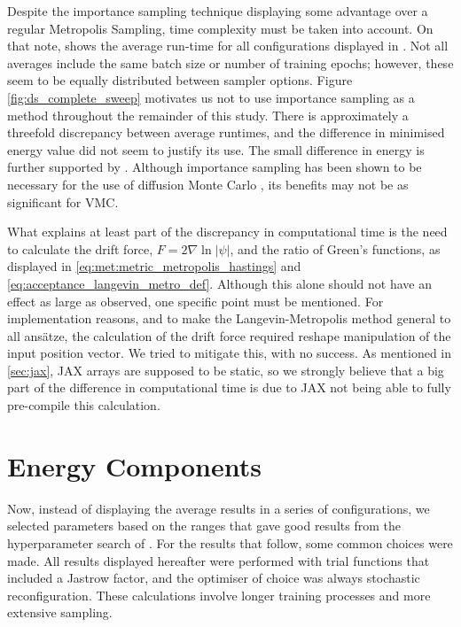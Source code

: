Despite the importance sampling technique displaying some advantage over a regular Metropolis Sampling, time complexity must be taken into account. On that note,  shows the average run-time for all configurations displayed in . Not all averages include the same batch size or number of training epochs; however, these seem to be equally distributed between sampler options. Figure \ref{fig:ds_complete_sweep} motivates us not to use importance sampling as a method throughout the remainder of this study. There is approximately a threefold discrepancy between average runtimes, and the difference in minimised energy value did not seem to justify its use. The small difference in energy is further supported by \cite{Nordhagen2019}. Although importance sampling has been shown to be necessary for the use of diffusion Monte Carlo \cite{kalos1974helium}, its benefits may not be as significant for VMC.

What explains at least part of the discrepancy in computational time is the need to calculate the drift force, $F = 2\nabla\ln|\psi|$, and the ratio of Green's functions, as displayed in \eqref{eq:met:metric_metropolis_hastings} and \eqref{eq:acceptance_langevin_metro_def}. Although this alone should not have an effect as large as observed, one specific point must be mentioned. For implementation reasons, and to make the Langevin-Metropolis method general to all ansätze, the calculation of the drift force required reshape manipulation of the input position vector. We tried to mitigate this, with no success. As mentioned in \ref{sec:jax}, JAX arrays are supposed to be static, so we strongly believe that a big part of the difference in computational time is due to JAX not being able to fully pre-compile this calculation.

\section{Energy Components}

Now, instead of displaying the average results in a series of configurations, we selected parameters based on the ranges that gave good results from the hyperparameter search of . For the results that follow, some common choices were made. All results displayed hereafter were performed with trial functions that included a Jastrow factor, and the optimiser of choice was always stochastic reconfiguration. These calculations involve longer training processes and more extensive sampling.

